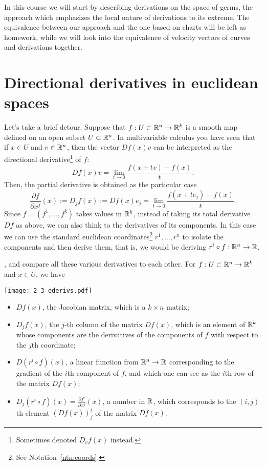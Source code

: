 In this course we will start by describing derivations on the space of germs, the approach which emphasizes the local nature of derivations to its extreme.
The equivalence between our approach and the one based on charts will be left as homework, while we will look into the equivalence of velocity vectors of curves and derivations together.

\section{Directional derivatives in euclidean spaces}\label{sec:dd}

Let's take a brief detour.
Suppose that $f: U\subset\mathbb{R}^n\to\mathbb{R}^k$ is a smooth map defined on an open subset $U\subset \mathbb{R}^n$.
In multivariable calculus you have seen that if $x\in U$ and $v\in\mathbb{R}^n$, then the vector $Df(x) v$ can be interpreted as the directional derivative\footnote{Sometimes denoted $D_v f(x)$ instead.} of $f$:
\begin{equation}
  Df(x) v = \lim_{t\to0}\frac{f(x+tv) - f(x)}{t}.
\end{equation}
Then, the partial derivative is obtained as the particular case
\begin{equation}
  \frac{\partial f}{\partial x^j}(x) := D_jf(x) := Df(x) e_j = \lim_{t\to0} \frac{f(x+te_j) - f(x)}{t}.
\end{equation}
Since $f=(f^1, \ldots, f^k)$ takes values in $\mathbb{R}^k$, instead of taking its total derivative $Df$ as above, we can also think to the derivatives of its components.
In this case we can use the standard euclidean coordinates\footnote{See Notation~\ref{ntn:coords}.} $r^1, \ldots, r^n$ to isolate the components and then derive them, that is, we would be deriving $r^i \circ f : \mathbb{R}^n \to \mathbb{R}$.

, and compare all these various derivatives to each other.
For $f:U\subset\mathbb{R}^n\to\mathbb{R}^k$ and $x\in U$, we have
\begin{marginfigure}[3.5cm]
  \texttt{[image: 2\_3-ederivs.pdf]}
\end{marginfigure}
\begin{itemize}
  \item $Df(x)$, the Jacobian matrix, which is a $k\times n$ matrix;
  \item $D_j f(x)$, the $j$-th column of the matrix $Df(x)$, which is an element of $\mathbb{R}^k$ whose components are the derivatives of the components of $f$ with respect to the $j$th coordinate;
  \item $D(r^i\circ f)(x)$, a linear function from $\mathbb{R}^n \to \mathbb{R}$ corresponding to the gradient of the $i$th component of $f$, and which one can see as the $i$th row of the matrix $Df(x)$;
  \item $D_j(r^i\circ f)(x) = \frac{\partial f^i}{\partial x^j}(x)$, a number in $\mathbb{R}$, which corresponds to the $(i,j)$th element $(Df(x))_j^i$ of the matrix $Df(x)$.
\end{itemize}

